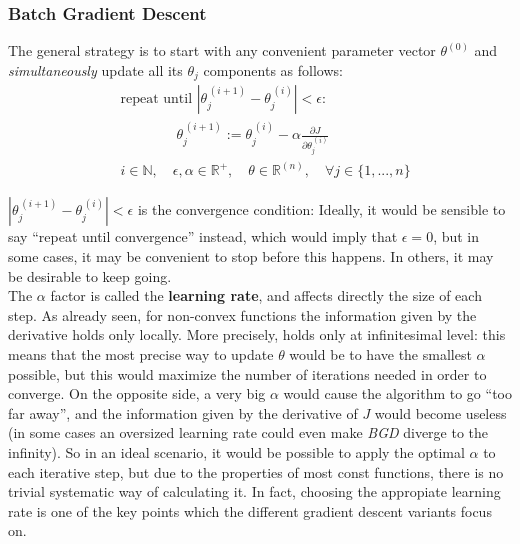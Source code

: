 \subsubsection{Batch Gradient Descent}

The general strategy is to start with any convenient parameter vector \(\theta^{(0)}\) and {\it simultaneously} update all its \(\theta_j\) components as follows:
\begin{equation*}
  \begin{aligned}
    & \text{repeat until \(|\theta_j^{\,(i+1)}-\theta_j^{\,(i)}|<\epsilon\):}\\[5mm]
    & \qquad \qquad \theta_j^{\,(i+1)} :=  \theta_j^{\,(i)}-\alpha\frac{\partial J}{\partial\theta^{\,(i)}_j}  \\[3mm]
    & i \in \mathbb{N}, \quad \epsilon, \alpha \in \mathbb{R}^+, \quad \theta  \in \mathbb{R}^{(n)}, \quad  \forall j \in \{1, ...,  n\}
  \end{aligned}
\end{equation*}

\(|\theta_j^{\,(i+1)}-\theta_j^{\,(i)}|<\epsilon\) is the convergence condition: Ideally, it would be sensible to say ``repeat until convergence'' instead, which would imply that \(\epsilon=0\), but in some cases, it may be convenient to stop before this happens. In others, it may be desirable to keep going.\\

The \(\alpha\) factor is called the \textbf{learning rate}, and affects directly the size of each step. As already seen, for non-convex functions the information given by the derivative holds only locally. More precisely, holds only at infinitesimal level: this means that the most precise way to update \(\theta\) would be to have the smallest \(\alpha\) possible, but this would maximize the number of iterations needed in order to converge. On the opposite side, a very big \(\alpha\) would cause the algorithm to go ``too far away'', and the information given by the derivative of \(J\) would become useless (in some cases an oversized learning rate could even make {\it BGD} diverge to the infinity). So in an ideal scenario, it would be possible to apply the optimal \(\alpha\) to each iterative step, but due to the properties of most const functions, there is no trivial systematic way of calculating it. In fact, choosing the appropiate learning rate is one of the key points which the different gradient descent variants focus on.\\

